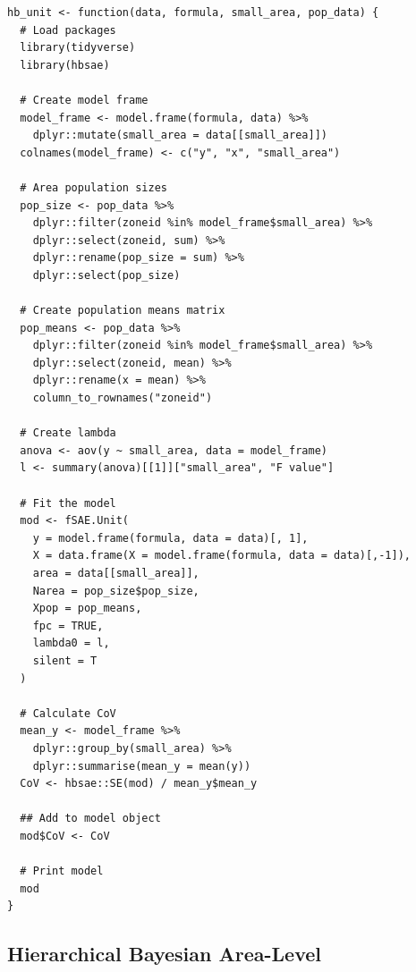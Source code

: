 \documentclass[12pt,twoside]{reedthesis}
\begin{document}
\begin{verbatim}
hb_unit <- function(data, formula, small_area, pop_data) {
  # Load packages
  library(tidyverse)
  library(hbsae)
  
  # Create model frame
  model_frame <- model.frame(formula, data) %>%
    dplyr::mutate(small_area = data[[small_area]])
  colnames(model_frame) <- c("y", "x", "small_area")
  
  # Area population sizes
  pop_size <- pop_data %>%
    dplyr::filter(zoneid %in% model_frame$small_area) %>%
    dplyr::select(zoneid, sum) %>%
    dplyr::rename(pop_size = sum) %>%
    dplyr::select(pop_size)
  
  # Create population means matrix
  pop_means <- pop_data %>%
    dplyr::filter(zoneid %in% model_frame$small_area) %>%
    dplyr::select(zoneid, mean) %>%
    dplyr::rename(x = mean) %>%
    column_to_rownames("zoneid")
  
  # Create lambda
  anova <- aov(y ~ small_area, data = model_frame)
  l <- summary(anova)[[1]]["small_area", "F value"]
  
  # Fit the model
  mod <- fSAE.Unit(
    y = model.frame(formula, data = data)[, 1],
    X = data.frame(X = model.frame(formula, data = data)[,-1]),
    area = data[[small_area]],
    Narea = pop_size$pop_size,
    Xpop = pop_means,
    fpc = TRUE,
    lambda0 = l,
    silent = T
  )

  # Calculate CoV
  mean_y <- model_frame %>%
    dplyr::group_by(small_area) %>%
    dplyr::summarise(mean_y = mean(y))
  CoV <- hbsae::SE(mod) / mean_y$mean_y

  ## Add to model object
  mod$CoV <- CoV

  # Print model
  mod
}
\end{verbatim}
\hypertarget{hierarchical-bayesian-area-level}{%
\subsection{Hierarchical Bayesian Area-Level}\label{hierarchical-bayesian-area-level}}
\end{document}
